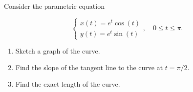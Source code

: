 \documentclass[12pt]{article}
\begin{document}
Consider the parametric equation

$$\left\lbrace\begin{array}{c}
x(t) = e^t\cos(t)\\
y(t) = e^t\sin(t)
\end{array}\right.,\quad 0\leq t\leq \pi.$$

\begin{enumerate}
\item
Sketch a graph of the curve.

\vspace{2.5in}
\item
Find the slope of the tangent line to the curve at $t = \pi/2$.
\vspace{2in}

\item
Find the exact length of the curve.

\end{enumerate}
\end{document}
